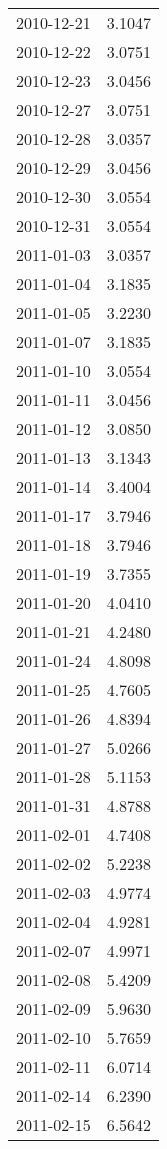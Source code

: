 \begin{tabular}{lr}
2010-12-21 &      3.1047 \\
2010-12-22 &      3.0751 \\
2010-12-23 &      3.0456 \\
2010-12-27 &      3.0751 \\
2010-12-28 &      3.0357 \\
2010-12-29 &      3.0456 \\
2010-12-30 &      3.0554 \\
2010-12-31 &      3.0554 \\
2011-01-03 &      3.0357 \\
2011-01-04 &      3.1835 \\
2011-01-05 &      3.2230 \\
2011-01-07 &      3.1835 \\
2011-01-10 &      3.0554 \\
2011-01-11 &      3.0456 \\
2011-01-12 &      3.0850 \\
2011-01-13 &      3.1343 \\
2011-01-14 &      3.4004 \\
2011-01-17 &      3.7946 \\
2011-01-18 &      3.7946 \\
2011-01-19 &      3.7355 \\
2011-01-20 &      4.0410 \\
2011-01-21 &      4.2480 \\
2011-01-24 &      4.8098 \\
2011-01-25 &      4.7605 \\
2011-01-26 &      4.8394 \\
2011-01-27 &      5.0266 \\
2011-01-28 &      5.1153 \\
2011-01-31 &      4.8788 \\
2011-02-01 &      4.7408 \\
2011-02-02 &      5.2238 \\
2011-02-03 &      4.9774 \\
2011-02-04 &      4.9281 \\
2011-02-07 &      4.9971 \\
2011-02-08 &      5.4209 \\
2011-02-09 &      5.9630 \\
2011-02-10 &      5.7659 \\
2011-02-11 &      6.0714 \\
2011-02-14 &      6.2390 \\
2011-02-15 &      6.5642 \\

\end{tabular}
